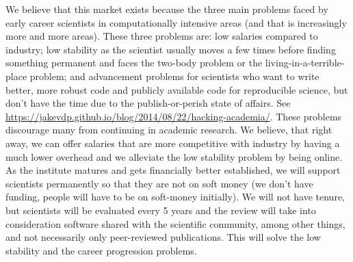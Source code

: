 We believe that this market exists because the three main problems faced by early career scientists in computationally intensive areas (and that is increasingly more and more areas). These three problems are: low salaries compared to industry; low stability as the scientist usually moves a few times before finding something permanent and faces the two-body problem or the living-in-a-terrible-place problem; and advancement problems for scientists who want to write better, more robust code and publicly available code for reproducible science, but don't have the time due to the publish-or-perish state of affairs. See \url{https://jakevdp.github.io/blog/2014/08/22/hacking-academia/}. These problems discourage many from continuing in academic research. We believe, that right away, we can offer salaries that are more competitive with industry by having a much lower overhead and we alleviate the low stability problem by being online. As the institute matures and gets financially better established, we will support scientists permanently so that they are not on soft money (we don't have funding, people will have to be on soft-money initially). We will not have tenure, but scientists will be evaluated every 5 years and the review will take into consideration software shared with the scientific community, among other things, and not necessarily only peer-reviewed publications. This will solve the low stability and the career progression problems.